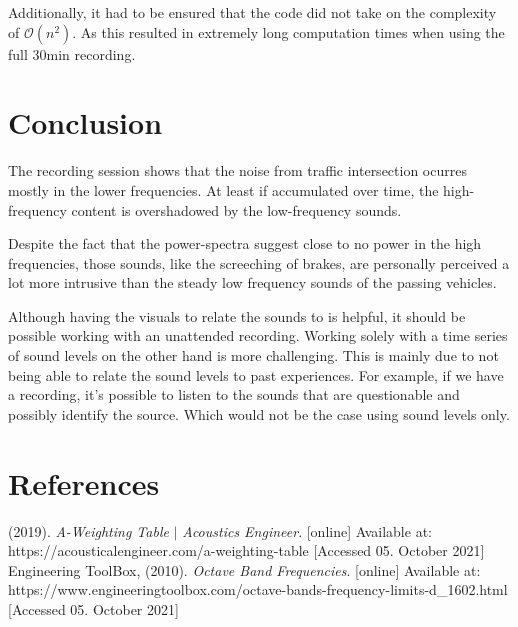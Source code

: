 \documentclass[twocolumn]{article}
\begin{document}
Additionally, it had to be ensured that the code did not take on the complexity of
$\mathcal{O}\left(n^2\right)$.
As this resulted in extremely long computation times when using the full $30\textrm{min}$ recording.

\section{Conclusion}
The recording session shows that the noise from traffic intersection ocurres mostly in the lower
frequencies.
At least if accumulated over time, the high-frequency content is overshadowed by the low-frequency sounds.

Despite the fact that the power-spectra suggest close to no power in the high frequencies,
those sounds, like the screeching of brakes, are personally perceived a lot more intrusive than the steady
low frequency sounds of the passing vehicles.

Although having the visuals to relate the sounds to is helpful, it should be possible working with an
unattended recording.
Working solely with a time series of sound levels on the other hand is more challenging.
This is mainly due to not being able to relate the sound levels to past experiences.
For example, if we have a recording, it's possible to listen to the sounds that are
questionable and possibly identify the source.
Which would not be the case using sound levels only.

\section{References}

\small

\begin{thebibliography}{1}
     (2019). \emph{A-Weighting Table} $|$ \emph{Acoustics Engineer}.
        [online] Available at: https://acousticalengineer.com/a-weighting-table
        [Accessed 05. October 2021]
     Engineering ToolBox, (2010). \emph{Octave Band Frequencies}.
        [online] Available at: https://www.engineeringtoolbox.com/octave-bands-frequency-limits-d\_1602.html
        [Accessed 05. October 2021]
\end{thebibliography}
\end{document}
